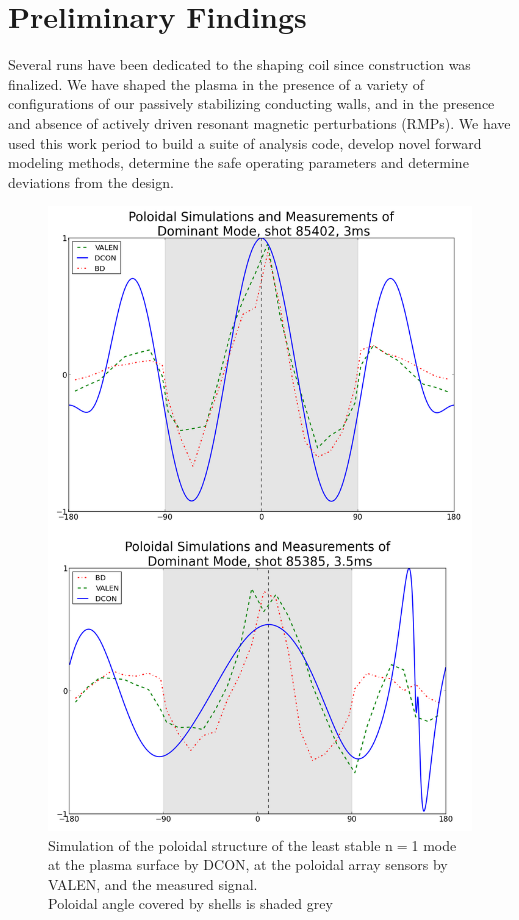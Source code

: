 \documentclass[aps,prl,twocolumn,superscriptaddress,groupedaddress]{revtex4}  %
\begin{document}
\section{Preliminary Findings}
	Several runs have been dedicated to the shaping coil since construction was finalized.  We have shaped the plasma in the presence of a variety of configurations of our passively stabilizing conducting walls, and in the presence and absence of actively driven resonant magnetic perturbations (RMPs).  We have used this work period to build a suite of analysis code, develop novel forward modeling methods, determine the safe operating parameters and determine deviations from the design. \par 
\begin{figure}[b]
	\centering
\includegraphics[scale=.22]{../Plots/DCON_VALEN_BD_comp_sh_unsh.png}\caption{Simulation of the poloidal structure of the least stable n$=$1 mode at the plasma surface by DCON, at the poloidal array sensors by VALEN, and the measured signal.\\  Poloidal angle covered by shells is shaded grey}
	\label{nat_mode_sim_v_meas}
	\end{figure}
\end{document}
